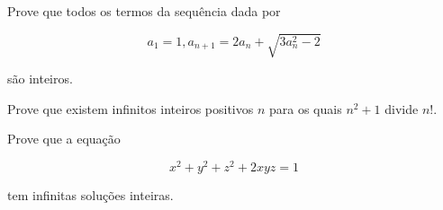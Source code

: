 \begin{questao}
  Prove que todos os termos da sequência dada por

  $$ a_1=1, a_{n+1} = 2a_n+\sqrt{3a_n^2-2} $$

  são inteiros.
\end{questao}

\begin{questao}
  Prove que existem infinitos inteiros positivos $n$ para
  os quais $n^2+1$ divide $n!$.
\end{questao}

\begin{questao}
  Prove que a equação

  $$ x^2+y^2+z^2+2xyz = 1 $$

  tem infinitas soluções inteiras.
\end{questao}

